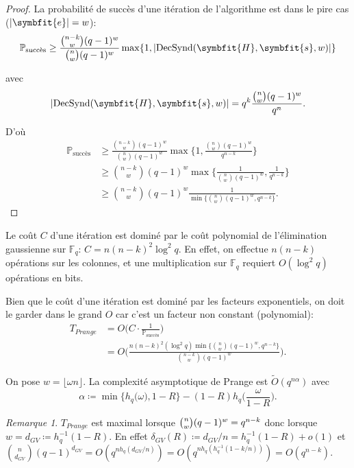 \documentclass{scrartcl}[a4paper,9pt,headings=small,footinclude=false]
\theoremstyle{definition}
\theoremstyle{remark}
\newtheorem*{remark}{Remarque}
\begin{document}
\begin{proof}
La probabilité de succès d'une itération de l'algorithme est dans le pire cas ($|\symbfit{e}|=w$):
\[ \mathbb{P}_{\text{succès}} \geq \frac{\binom{n-k}{w}(q-1)^w}{\binom{n}{w}(q-1)^w} \max \{1, |\text{DecSynd}(\symbfit{H},\symbfit{s},w)|\}\]

avec 
\[ |\text{DecSynd}(\symbfit{H},\symbfit{s},w)| = q^k \frac{\binom{n}{w}(q-1)^w}{q^n}. \]

D'où
\begin{align*}
    \mathbb{P}_{\text{succès}} &\geq \frac{\binom{n-k}{w}(q-1)^w}{\binom{n}{w}(q-1)^w} \max \Big\{1,\frac{\binom{n}{w}(q-1)^w}{q^{n-k}}\Big\}\\
    &\geq \binom{n-k}{w}(q-1)^w \max \Big\{\frac{1}{\binom{n}{w}(q-1)^w},\frac{1}{q^{n-k}}\Big\}\\
    &\geq \binom{n-k}{w}(q-1)^w \frac{1}{\min \{\binom{n}{w}(q-1)^w,q^{n-k}\}}.
\end{align*}
\end{proof}

Le coût $C$ d'une itération est dominé par le coût polynomial de l'élimination gaussienne sur $\mathbb{F}_q$: $C=n(n-k)^2\log^2 q$. En effet, on effectue $n(n-k)$ opérations sur les colonnes, et une multiplication sur $\mathbb{F}_q$ requiert $O(\log^2 q)$ opérations en bits.

Bien que le coût d'une itération est dominé par les facteurs exponentiels, on doit le garder dans le grand $O$ car c'est un facteur non constant (polynomial):
\begin{align*}
    T_{Prange} &= O\Big(C \cdot \frac{1}{\mathbb{P}_{\text{succès}}}\Big)\\
&= O\Bigg(\frac{n(n-k)^2(\log^2 q)\min \big\{\binom{n}{w}(q-1)^w,q^{n-k}\big\}}{\binom{n-k}{w}(q-1)^w} \Bigg).
\end{align*}

On pose $w=\lfloor \omega n \rfloor$.
La complexité asymptotique de Prange est $\tilde{O}(q^{n\alpha})$
avec \[\alpha\coloneq \min\big\{ h_q\big(\omega\big), 1-R \big\} - ( 1-R)h_q\bigg(\frac{\omega}{1-R}\bigg).\]

\begin{remark}
$T_{Prange}$ est maximal lorsque $\tbinom{n}{w}(q-1)^w=q^{n-k}$ donc lorsque $w=d_{GV}\coloneq h_q^{-1}(1-R)$. En effet $\delta_{GV}(R)\coloneq d_{GV}/n=h_q^{-1}(1-R)+o(1)$ et $\binom{n}{d_{GV}}(q-1)^{d_{GV}}=O(q^{nh_q(d_{GV}/n)})=O(q^{nh_q(h_q^{-1}(1-k/n))})=O(q^{n-k})$. %
\end{remark}
\end{document}
